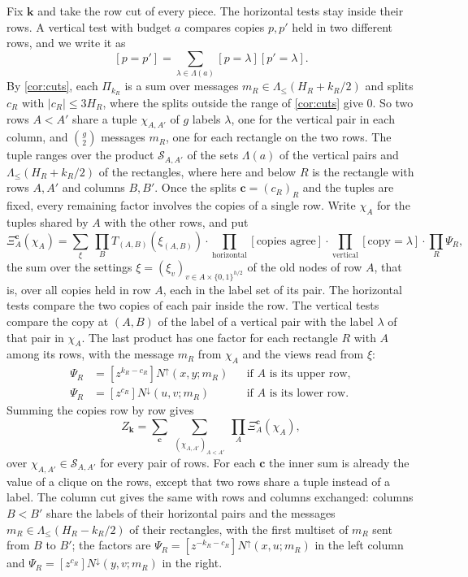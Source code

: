 \documentclass[11pt]{article}
\theoremstyle{definition}
\theoremstyle{definition}
\theoremstyle{remark}
\newcommand{\Nup}{N^{\uparrow}}
\newcommand{\Ndown}{N^{\downarrow}}
\begin{document}
Fix $\mathbf k$ and take the row cut of every piece. The horizontal tests stay inside their rows. A vertical test with budget $a$ compares copies $p,p'$ held in two different rows, and we write it as
\[
[p=p']=\sum_{\lambda\in\Lambda(a)}[p=\lambda][p'=\lambda].
\]
By \cref{cor:cuts}, each $\Pi_{k_R}$ is a sum over messages $m_R\in\Lambda_{\le}(H_R+k_R/2)$ and splits $c_R$ with $|c_R|\le3H_R$, where the splits outside the range of \cref{cor:cuts} give $0$. So two rows $A<A'$ share a tuple $\chi_{A,A'}$ of $g$ labels $\lambda$, one for the vertical pair in each column, and $\binom g2$ messages $m_R$, one for each rectangle on the two rows. The tuple ranges over the product $\mathcal S_{A,A'}$ of the sets $\Lambda(a)$ of the vertical pairs and $\Lambda_{\le}(H_R+k_R/2)$ of the rectangles, where here and below $R$ is the rectangle with rows $A,A'$ and columns $B,B'$. Once the splits $\mathbf c=(c_R)_R$ and the tuples are fixed, every remaining factor involves the copies of a single row. Write $\chi_A$ for the tuples shared by $A$ with the other rows, and put
\begin{equation}\label{eq:table}
\Xi^{\mathbf c}_A(\chi_A)=\sum_\xi\ \prod_BT_{(A,B)}(\xi_{(A,B)})\cdot\prod_{\text{horizontal}}[\text{copies agree}]\cdot\prod_{\text{vertical}}[\text{copy}=\lambda]\cdot\prod_R\Psi_R,
\end{equation}
the sum over the settings $\xi=(\xi_v)_{v\in A\times\{0,1\}^{h/2}}$ of the old nodes of row $A$, that is, over all copies held in row $A$, each in the label set of its pair. The horizontal tests compare the two copies of each pair inside the row. The vertical tests compare the copy at $(A,B)$ of the label of a vertical pair with the label $\lambda$ of that pair in $\chi_A$. The last product has one factor for each rectangle $R$ with $A$ among its rows, with the message $m_R$ from $\chi_A$ and the views read from $\xi$:
\begin{align*}
\Psi_R&=[z^{k_R-c_R}]\Nup(x,y;m_R) &&\text{if $A$ is its upper row},\\
\Psi_R&=[z^{c_R}]\Ndown(u,v;m_R) &&\text{if $A$ is its lower row}.
\end{align*}
Summing the copies row by row gives
\begin{equation}\label{eq:rowsum}
Z_{\mathbf k}=\sum_{\mathbf c}\ \sum_{(\chi_{A,A'})_{A<A'}}\ \prod_A\Xi^{\mathbf c}_A(\chi_A),
\end{equation}
over $\chi_{A,A'}\in \mathcal S_{A,A'}$ for every pair of rows. For each $\mathbf c$ the inner sum is already the value of a clique on the rows, except that two rows share a tuple instead of a label. The column cut gives the same with rows and columns exchanged: columns $B<B'$ share the labels of their horizontal pairs and the messages $m_R\in\Lambda_{\le}(H_R-k_R/2)$ of their rectangles, with the first multiset of $m_R$ sent from $B$ to $B'$; the factors are $\Psi_R=[z^{-k_R-c_R}]\Nup(x,u;m_R)$ in the left column and $\Psi_R=[z^{c_R}]\Ndown(y,v;m_R)$ in the right.
\end{document}

